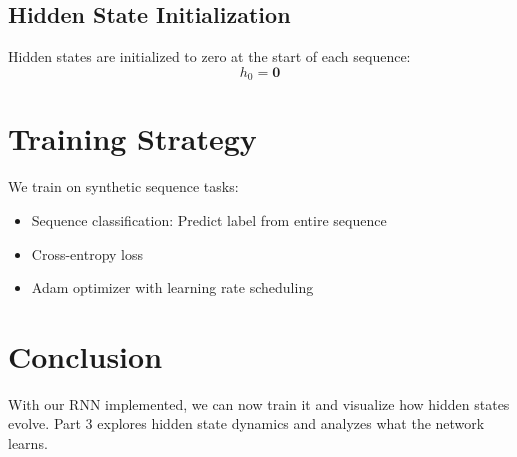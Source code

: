 \documentclass[12pt]{article}
\begin{document}
\subsection{Hidden State Initialization}
Hidden states are initialized to zero at the start of each sequence:
\begin{equation}
    h_0 = \mathbf{0}
\end{equation}

\section{Training Strategy}
We train on synthetic sequence tasks:
\begin{itemize}
    \item Sequence classification: Predict label from entire sequence
    \item Cross-entropy loss
    \item Adam optimizer with learning rate scheduling
\end{itemize}

\section{Conclusion}
With our RNN implemented, we can now train it and visualize how hidden states evolve. Part 3 explores hidden state dynamics and analyzes what the network learns.
\end{document}
